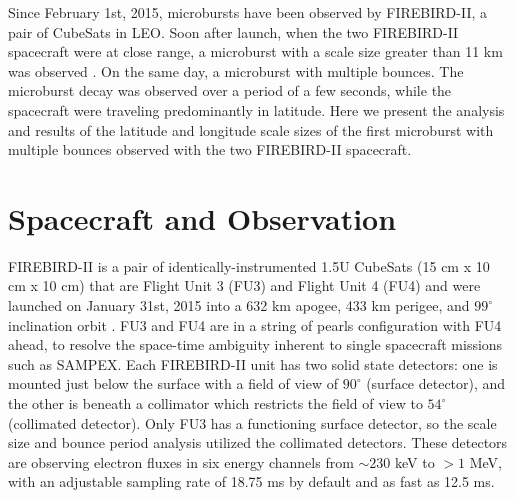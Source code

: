 \documentclass[draft, linenumbers]{agujournal}
\begin{document}
Since February 1st, 2015, microbursts have been observed by FIREBIRD-II, a pair of CubeSats in LEO. Soon after launch, when the two FIREBIRD-II spacecraft were at close range, a microburst with a scale size greater than 11 km was observed \citep{Crew2016}. On the same day,  a microburst with multiple bounces.  The microburst decay was observed over a period of a few seconds, while the spacecraft were traveling predominantly in latitude. Here we present the analysis and results of the latitude and longitude scale sizes of the first microburst with multiple bounces observed with the two FIREBIRD-II spacecraft.


\section{Spacecraft and Observation} \label{obs} %
FIREBIRD-II is a pair of identically-instrumented 1.5U CubeSats (15 cm x 10 cm x 10 cm) that are  Flight Unit 3 (FU3) and Flight Unit 4 (FU4) and were launched on January 31st, 2015 into a 632 km apogee, 433 km perigee, and $99^{\circ}$ inclination orbit \citep{Crew2016}. FU3 and FU4 are  in a string of pearls configuration with FU4 ahead, to resolve the space-time ambiguity inherent to single spacecraft missions such as SAMPEX. Each FIREBIRD-II unit has two solid state detectors: one is mounted just below the surface with a field of view of $90^{\circ}$ (surface detector), and the other is beneath a collimator which restricts the field of view to $54^{\circ}$ (collimated detector). Only FU3 has a functioning surface detector, so the scale size and bounce period analysis utilized the collimated detectors. These detectors are observing electron fluxes in six energy channels from $\sim 230$ keV to $> 1$ MeV, with an adjustable sampling rate of 18.75 ms by default and as fast as 12.5 ms. 
\end{document}
